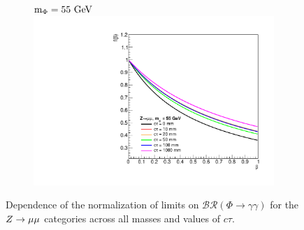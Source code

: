 \begin{figure}[htb!]
\begin{subfigure}{0.3\linewidth}
	\end{subfigure}
	\begin{subfigure}{0.3\linewidth}
		\centering
		$\mphi=55\unit{GeV}$
		\includegraphics[width=\linewidth]{figs/05_analysis/BR_Z_MU_55.pdf}
	\end{subfigure}
	\caption[Dependence of the normalization of limits on $\mathcal{BR}(\Phi\to\gamma\gamma)$ for the $\VZ\to\mu\mu$ categories across all masses and values of $c\tau$.]{Dependence of the normalization of limits on $\mathcal{BR}(\Phi\to\gamma\gamma)$ for the $\VZ\to\mu\mu$ categories across all masses and values of $c\tau$.}
	\label{fig:BR_MU}
\end{figure}

